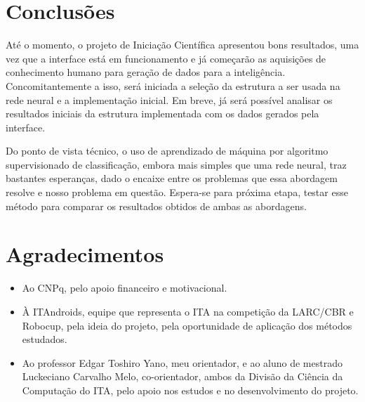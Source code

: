 \documentclass[a4paper,12pt]{article}
\begin{document}
\section{Conclusões}

Até o momento, o projeto de Iniciação Científica apresentou bons resultados, uma vez que a interface está em funcionamento e já começarão as aquisições de conhecimento humano para geração de dados para a inteligência. Concomitantemente a isso, será iniciada a seleção da estrutura a ser usada na rede neural e a implementação inicial. Em breve, já será possível analisar os resultados iniciais da estrutura implementada com os dados gerados pela interface.

Do ponto de vista técnico, o uso de aprendizado de máquina por algoritmo supervisionado de classificação, embora mais simples que uma rede neural, traz bastantes esperanças, dado o encaixe entre os problemas que essa abordagem resolve e nosso problema em questão. Espera-se para próxima etapa, testar esse método para comparar os resultados obtidos de ambas as abordagens.

\section{Agradecimentos}

\begin{itemize}
\item Ao CNPq, pelo apoio financeiro e motivacional.
\item À ITAndroids, equipe que representa o ITA na competição da LARC/CBR e Robocup, pela ideia do projeto, pela oportunidade de aplicação dos métodos estudados.
\item Ao professor Edgar Toshiro Yano, meu orientador, e ao aluno de mestrado Luckeciano Carvalho Melo, co-orientador, ambos da Divisão da Ciência da Computação do ITA, pelo apoio nos estudos e no desenvolvimento do projeto.

\end{itemize}

\printbibliography
\end{document}
